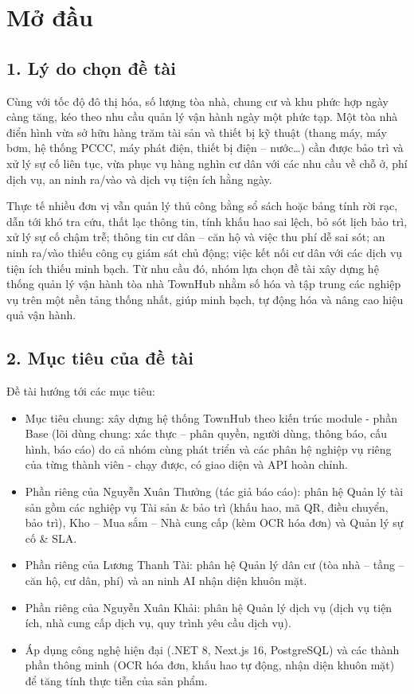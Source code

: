 \chapter*{Mở đầu}
\section*{1. Lý do chọn đề tài}
Cùng với tốc độ đô thị hóa, số lượng tòa nhà, chung cư và khu phức hợp ngày càng tăng, kéo theo nhu cầu quản lý vận hành ngày một phức tạp. Một tòa nhà điển hình vừa sở hữu hàng trăm tài sản và thiết bị kỹ thuật (thang máy, máy bơm, hệ thống PCCC, máy phát điện, thiết bị điện – nước\ldots{}) cần được bảo trì và xử lý sự cố liên tục, vừa phục vụ hàng nghìn cư dân với các nhu cầu về chỗ ở, phí dịch vụ, an ninh ra/vào và dịch vụ tiện ích hằng ngày.

Thực tế nhiều đơn vị vẫn quản lý thủ công bằng sổ sách hoặc bảng tính rời rạc, dẫn tới khó tra cứu, thất lạc thông tin, tính khấu hao sai lệch, bỏ sót lịch bảo trì, xử lý sự cố chậm trễ; thông tin cư dân – căn hộ và việc thu phí dễ sai sót; an ninh ra/vào thiếu công cụ giám sát chủ động; việc kết nối cư dân với các dịch vụ tiện ích thiếu minh bạch. Từ nhu cầu đó, nhóm lựa chọn đề tài xây dựng hệ thống quản lý vận hành tòa nhà TownHub nhằm số hóa và tập trung các nghiệp vụ trên một nền tảng thống nhất, giúp minh bạch, tự động hóa và nâng cao hiệu quả vận hành.

\section*{2. Mục tiêu của đề tài}
Đề tài hướng tới các mục tiêu:

\begin{itemize}[leftmargin=1.4em,itemsep=1pt,topsep=2pt]
  \item Mục tiêu chung: xây dựng hệ thống TownHub theo kiến trúc module - phần Base (lõi dùng chung: xác thực – phân quyền, người dùng, thông báo, cấu hình, báo cáo) do cả nhóm cùng phát triển và các phân hệ nghiệp vụ riêng của từng thành viên - chạy được, có giao diện và API hoàn chỉnh.
  \item Phần riêng của Nguyễn Xuân Thưởng (tác giả báo cáo): phân hệ Quản lý tài sản gồm các nghiệp vụ Tài sản \& bảo trì (khấu hao, mã QR, điều chuyển, bảo trì), Kho – Mua sắm – Nhà cung cấp (kèm OCR hóa đơn) và Quản lý sự cố \& SLA.
  \item Phần riêng của Lương Thanh Tài: phân hệ Quản lý dân cư (tòa nhà – tầng – căn hộ, cư dân, phí) và an ninh AI nhận diện khuôn mặt.
  \item Phần riêng của Nguyễn Xuân Khải: phân hệ Quản lý dịch vụ (dịch vụ tiện ích, nhà cung cấp dịch vụ, quy trình yêu cầu dịch vụ).
  \item Áp dụng công nghệ hiện đại (.NET 8, Next.js 16, PostgreSQL) và các thành phần thông minh (OCR hóa đơn, khấu hao tự động, nhận diện khuôn mặt) để tăng tính thực tiễn của sản phẩm.
\end{itemize}
